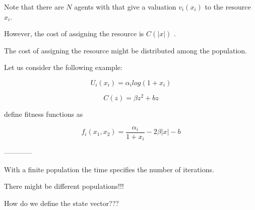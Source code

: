 \documentclass[a4paper,10pt]{article}
\begin{document}
Note that there are $N$ agents with that give a valuation $v_i(x_i)$ to the resource $x_i$.

However, the cost of assigning the resource is $C(|x|)$ .

The cost of assigning the resource might be distributed among the population. 

Let us consider the following example:


\begin{equation}
U_i(x_i) =   \alpha_i  log(1+x_i) 
\end{equation}

\begin{equation}
C(z) = \beta z^2 + b z 
\end{equation}

define fitness functions as 

\begin{equation}
f_i(x_1, x_2) = \frac{\alpha_i}{1+x_i} - 2 \beta |x| - b 
\end{equation}










------------

With a finite population the time specifies the number of iterations.

There might be different populations!!!

How do we define the state vector???




\fi

\end{document}
